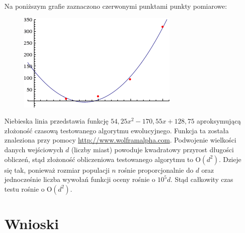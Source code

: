 \documentclass[12pt, a4paper]{article}
\begin{document}
Na poniższym grafie zaznaczono czerwonymi punktami punkty pomiarowe:

\begin{figure}[H]
\centering
  \includegraphics[width=.5\textwidth]{time.png}
\end{figure}

Niebieska linia przedstawia funkcję $54,25x^2 - 170,55x + 128,75$ aproksymującą
złożoność czasową testowanego algorytmu ewolucyjnego. Funkcja ta została znaleziona przy pomocy
\url{http://www.wolframalpha.com}. Podwojenie wielkości danych wejściowych $d$ (liczby miast) powoduje
kwadratowy przyrost długości obliczeń, stąd złożoność obliczeniowa 
testowanego algorytmu to O$(d^2)$. Dzieje się tak, ponieważ rozmiar populacji $n$ rośnie
proporcjonalnie do $d$ oraz jednocześnie liczba wywołań funkcji oceny rośnie o $10^5d$.
Stąd całkowity czas testu rośnie o O$(d^2)$.

\section{Wnioski}
\end{document}
